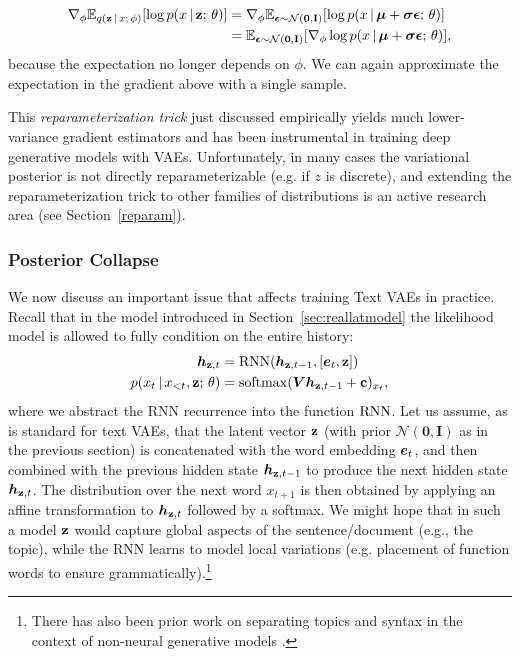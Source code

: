 \documentclass{article}
\begin{document}
\begin{align*}
\nabla_\phi \mathbb{E}_{q(\mathbf{z} \,|\, x ; \, \phi)} [ \log p(x \,|\, \mathbf{z} ; \, \theta)] &=
\nabla_\phi  \mathbb{E}_{\boldsymbol{\epsilon} \sim \mathcal{N}(\mathbf{0}, \mathbf{I})}[\log p(x \,|\, \boldsymbol{\mu} + \boldsymbol{\sigma} \boldsymbol{\epsilon} ; \, \theta)] \\
&=  \mathbb{E}_{\boldsymbol{\epsilon} \sim \mathcal{N}(\mathbf{0}, \mathbf{I})}[\nabla_\phi \log p(x \,|\, \boldsymbol{\mu} + \boldsymbol{\sigma} \boldsymbol{\epsilon} ; \, \theta)], 
\end{align*}
because the expectation no longer depends on $\phi$. We can again approximate the expectation in the gradient above with a single sample.

This \emph{reparameterization trick} just discussed empirically yields much lower-variance gradient estimators and
has been instrumental in training deep generative models with VAEs. Unfortunately, in many cases the
variational posterior is not directly reparameterizable (e.g. if $z$ is discrete), and extending the
reparameterization trick to other families of distributions is an active research area (see Section~\ref{reparam}).

\subsubsection{Posterior Collapse}\label{posteriorcollapse}
We now discuss an important issue that affects training Text VAEs in practice.
Recall that in the model introduced in Section~\ref{sec:reallatmodel} the likelihood model is allowed to fully condition on the entire history:
\begin{align*} 
\boldsymbol{h}_{\mathbf{z},t} &= \operatorname*{RNN}(\boldsymbol{h}_{\mathbf{z},t-1}, [\boldsymbol{e}_t, \mathbf{z}]) \\
p(x_{t} \,|\, x_{< t}, \mathbf{z} ; \, \theta) &= \operatorname*{softmax}(\boldsymbol{V} \boldsymbol{h}_{\mathbf{z},t-1} + \mathbf{c})_{x_t},
\end{align*}
where we abstract the RNN recurrence into the function $\operatorname*{RNN}$. 
Let us assume, as is standard for text VAEs, that the latent vector $\mathbf{z}$ (with prior $\mathcal{N}(\mathbf{0}, \mathbf{I})$ as in
the previous section) is concatenated with the word embedding $\boldsymbol{e}_t$, and then combined
with the previous hidden state $\boldsymbol{h}_{\mathbf{z}, t-1}$ to produce the next hidden state $\boldsymbol{h}_{\mathbf{z},t}$.
The distribution over the next word $x_{t+1}$ is then obtained by applying an 
affine transformation to $\boldsymbol{h}_{\mathbf{z},t}$ followed by a softmax. We might hope that in such a model $\mathbf{z}$ 
would capture global aspects of the sentence/document (e.g., the topic), while the RNN learns to model local variations 
(e.g. placement of function words to ensure grammatically).\footnote{There has also been prior work on separating topics and syntax in the context of non-neural generative models \citep{griffiths2004,boyd2008}.} 
\end{document}
